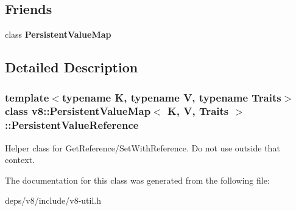 \subsection*{Friends}
\begin{DoxyCompactItemize}
\item 
\hypertarget{classv8_1_1_persistent_value_map_1_1_persistent_value_reference_aa96af8a34f1f35df272c683a483162da}{}class {\bfseries Persistent\+Value\+Map}\label{classv8_1_1_persistent_value_map_1_1_persistent_value_reference_aa96af8a34f1f35df272c683a483162da}

\end{DoxyCompactItemize}


\subsection{Detailed Description}
\subsubsection*{template$<$typename K, typename V, typename Traits$>$class v8\+::\+Persistent\+Value\+Map$<$ K, V, Traits $>$\+::\+Persistent\+Value\+Reference}

Helper class for Get\+Reference/\+Set\+With\+Reference. Do not use outside that context. 

The documentation for this class was generated from the following file\+:\begin{DoxyCompactItemize}
\item 
deps/v8/include/v8-\/util.\+h\end{DoxyCompactItemize}
